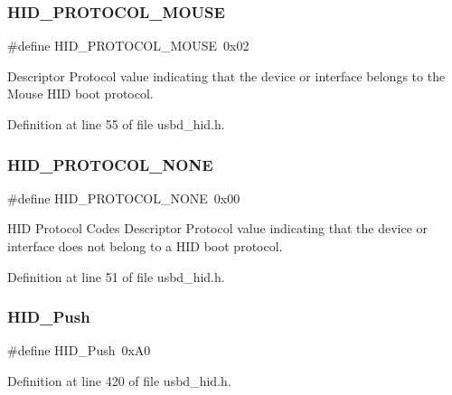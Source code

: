 \subsubsection{\texorpdfstring{H\+I\+D\+\_\+\+P\+R\+O\+T\+O\+C\+O\+L\+\_\+\+M\+O\+U\+SE}{HID\_PROTOCOL\_MOUSE}}
{\footnotesize\ttfamily \#define H\+I\+D\+\_\+\+P\+R\+O\+T\+O\+C\+O\+L\+\_\+\+M\+O\+U\+SE~0x02}

Descriptor Protocol value indicating that the device or interface belongs to the Mouse H\+ID boot protocol. 

Definition at line 55 of file usbd\+\_\+hid.\+h.

\mbox{\label{group___u_s_b_d___h_i_d_ga050926404254a7fa1d6b5253a79abc59}} 
\subsubsection{\texorpdfstring{H\+I\+D\+\_\+\+P\+R\+O\+T\+O\+C\+O\+L\+\_\+\+N\+O\+NE}{HID\_PROTOCOL\_NONE}}
{\footnotesize\ttfamily \#define H\+I\+D\+\_\+\+P\+R\+O\+T\+O\+C\+O\+L\+\_\+\+N\+O\+NE~0x00}

H\+ID Protocol Codes Descriptor Protocol value indicating that the device or interface does not belong to a H\+ID boot protocol. 

Definition at line 51 of file usbd\+\_\+hid.\+h.

\mbox{\label{group___u_s_b_d___h_i_d_ga4426093eb43ab09033d2399464b8e8da}} 
\subsubsection{\texorpdfstring{H\+I\+D\+\_\+\+Push}{HID\_Push}}
{\footnotesize\ttfamily \#define H\+I\+D\+\_\+\+Push~0x\+A0}



Definition at line 420 of file usbd\+\_\+hid.\+h.

